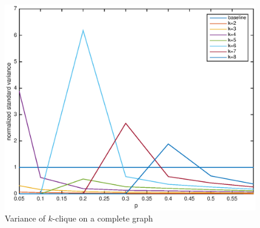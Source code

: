 \begin{figure}[h!]
\centering
\includegraphics[width=5in]{fig/variance.eps} %
\caption{Variance of $k$-clique on a complete graph}
\label{fig:perf}
\end{figure}

